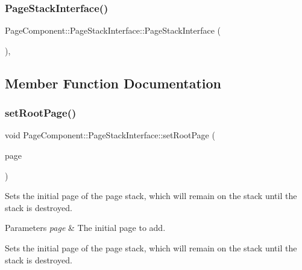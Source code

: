 \subsubsection{\texorpdfstring{Page\+Stack\+Interface()}{PageStackInterface()}}
{\footnotesize\ttfamily Page\+Component\+::\+Page\+Stack\+Interface\+::\+Page\+Stack\+Interface (\begin{DoxyParamCaption}{ }\end{DoxyParamCaption})\hspace{0.3cm}{\ttfamily [inline]}, {\ttfamily [protected]}}



\subsection{Member Function Documentation}
\mbox{\label{classPageComponent_1_1PageStackInterface_a3fd5acf64b88393abddc8889af82f8fc}} 
\subsubsection{\texorpdfstring{set\+Root\+Page()}{setRootPage()}}
{\footnotesize\ttfamily void Page\+Component\+::\+Page\+Stack\+Interface\+::set\+Root\+Page (\begin{DoxyParamCaption}\item[{\mbox{\hyperlink{classPageComponent}{Page\+Component}} $\ast$}]{page }\end{DoxyParamCaption})}

Sets the initial page of the page stack, which will remain on the stack until the stack is destroyed.


\begin{DoxyParams}{Parameters}
{\em page} & The initial page to add.\\
\hline
\end{DoxyParams}
Sets the initial page of the page stack, which will remain on the stack until the stack is destroyed. \mbox{\label{classPageComponent_1_1PageStackInterface_afa2722ee935d6577b184a948c5a24988}} 
